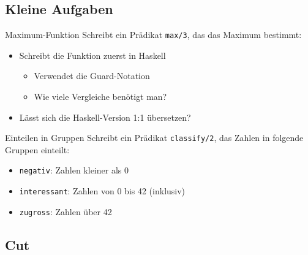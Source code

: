 \documentclass{beamer}
\begin{document}
\subsection{Kleine Aufgaben}

\begin{frame}{Maximum-Funktion}
    Schreibt ein Prädikat \texttt{max/3}, das das Maximum bestimmt:


    \begin{itemize}
        \item Schreibt die Funktion zuerst in Haskell
        \begin{itemize}
            \item Verwendet die Guard-Notation
            \item Wie viele Vergleiche benötigt man?
        \end{itemize}
        \item Lässt sich die Haskell-Version 1:1 übersetzen?
    \end{itemize}
\end{frame}

\begin{frame}{Einteilen in Gruppen}
    Schreibt ein Prädikat \texttt{classify/2}, das Zahlen in folgende Gruppen einteilt:

    \begin{itemize}
        \item \texttt{negativ}: Zahlen kleiner als 0
        \item \texttt{interessant}: Zahlen von 0 bis 42 (inklusiv)
        \item \texttt{zugross}: Zahlen über 42
    \end{itemize}

\end{frame}

\subsection{Cut}
\end{document}
